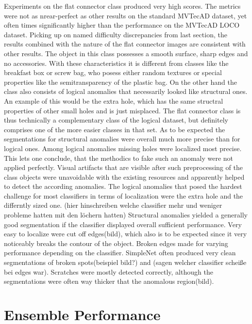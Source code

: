 Experiments on the flat connector class produced very high scores. The metrics were not as nrear-perfect as other results on the standard 
MVTecAD \cite{MVTEC_Bergmann_2021} dataset, yet often times significantly higher than the performance on the MVTecAD LOCO \cite{LOCODentsAndScratchesBergmann2022} 
dataset. Picking up on named difficulty discrepancies from last section, the results combined with the nature of the flat connector images 
are consistent with other results. The object in this class possesses a smooth surface, sharp edges and no accessories. With these 
characteristics it is different from classes like the breakfast box or screw bag, who posess either random textures or special properties 
like the semitransparency of the plastic bag. On the other hand the class also consists of logical anomalies that necessarily looked 
like structural ones. An example of this would be the extra hole, which has the same structral properties of other small holes and is 
just misplaced. The flat connector class is thus technically a complementary class of the logical dataset, but definitely comprises 
one of the more easier classes in that set. \newline
As to be expected the segmentations for structural anomalies were overall much more precise than for logical ones. Among logical anomalies 
missing holes were localized most precise. This lets one conclude, that the methodics to fake such an anomaly were not applied perfectly. 
Visual artifacts that are visible after such preprocessing of the class objects were unavoidable with the existing resources and apparently 
helped to detect the according anomalies. The logical anomalies that posed the hardest challenge for most classifiers in terms of localization 
were the extra hole and the differntly sized one. (hier hinschreiben welche classifier mehr und weniger probleme hatten mit den löchern hatten)
Structural anomalies yielded a generally good segmentation if the classifier displayed overall sufficient performance. Very easy to localize 
were cut off edges(bild), which also is to be expected since it very noticeably breaks the contour of the object. Broken edges made for 
varying performance depending on the classifier. SimpleNet often produced very clean segmentations of broken spots(beispiel bild?) and 
(sagen welcher classifier scheiße bei edges war). Scratches were mostly detected correctly, although the segmentations were often 
way thicker that the anomalous region(bild).



\section{Ensemble Performance}
\label{sec:ensemblediscussion}

